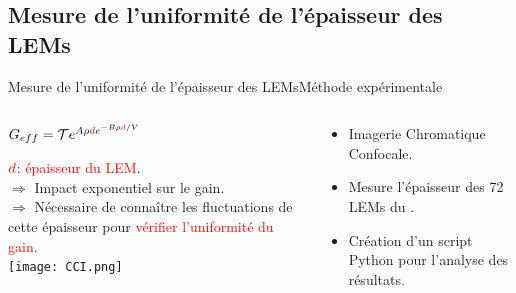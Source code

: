     \subsection[Épaisseur]{Mesure de l'uniformité de l'épaisseur des LEMs}

     \begin{frame}{Mesure de l'uniformité de l'épaisseur des LEMs}{Méthode expérimentale}
    	\begin{scriptsize}
    		\begin{columns}
    			\begin{column}{0.5\textwidth}
    				\begin{center}
        				\begin{normalsize}
        					$G _{eff}= \mathcal{T}e^{A\rho \textcolor{red}{d} e^{-B\rho \textcolor{red}{d}/V}}$\\
        				\end{normalsize}
    				\end{center}
    				$\textcolor{red}{d}$: \textcolor{red}{épaisseur du LEM}.\\
    				$\Rightarrow$ Impact exponentiel sur le gain.\\
    				$\Rightarrow$ Nécessaire de connaître les fluctuations de cette épaisseur pour \textcolor{red}{vérifier l'uniformité du gain}.\\
    				\vfill
    				\centering \texttt{[image: CCI.png]}\\\vfill
    			\end{column}
    			\hfill
    			\begin{column}{0.5\textwidth}
    				\begin{itemize}
    					\item Imagerie Chromatique Confocale.
    					\item Mesure l'épaisseur des 72 LEMs du \SSS{}.
    					\item Création d'un script Python pour l'analyse des résultats.
    				\end{itemize}

\end{column}
\end{columns}
\end{scriptsize}
\end{frame}
